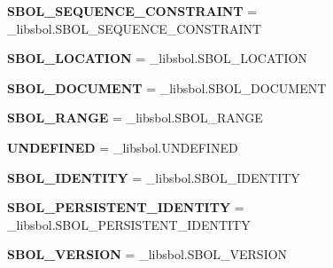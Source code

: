 \begin{DoxyCompactItemize}
\item 
{\bfseries S\+B\+O\+L\+\_\+\+S\+E\+Q\+U\+E\+N\+C\+E\+\_\+\+C\+O\+N\+S\+T\+R\+A\+I\+NT} = \+\_\+libsbol.\+S\+B\+O\+L\+\_\+\+S\+E\+Q\+U\+E\+N\+C\+E\+\_\+\+C\+O\+N\+S\+T\+R\+A\+I\+NT\hypertarget{namespacesbol_1_1libsbol_a6328208da40ad7d5da19bcf525c2790e}{}\label{namespacesbol_1_1libsbol_a6328208da40ad7d5da19bcf525c2790e}

\item 
{\bfseries S\+B\+O\+L\+\_\+\+L\+O\+C\+A\+T\+I\+ON} = \+\_\+libsbol.\+S\+B\+O\+L\+\_\+\+L\+O\+C\+A\+T\+I\+ON\hypertarget{namespacesbol_1_1libsbol_a0762a29718f5005067f16c55235fb21b}{}\label{namespacesbol_1_1libsbol_a0762a29718f5005067f16c55235fb21b}

\item 
{\bfseries S\+B\+O\+L\+\_\+\+D\+O\+C\+U\+M\+E\+NT} = \+\_\+libsbol.\+S\+B\+O\+L\+\_\+\+D\+O\+C\+U\+M\+E\+NT\hypertarget{namespacesbol_1_1libsbol_af6a785921d877371417eea332d1b019b}{}\label{namespacesbol_1_1libsbol_af6a785921d877371417eea332d1b019b}

\item 
{\bfseries S\+B\+O\+L\+\_\+\+R\+A\+N\+GE} = \+\_\+libsbol.\+S\+B\+O\+L\+\_\+\+R\+A\+N\+GE\hypertarget{namespacesbol_1_1libsbol_a3f0e6f012174781aa70df693dac69582}{}\label{namespacesbol_1_1libsbol_a3f0e6f012174781aa70df693dac69582}

\item 
{\bfseries U\+N\+D\+E\+F\+I\+N\+ED} = \+\_\+libsbol.\+U\+N\+D\+E\+F\+I\+N\+ED\hypertarget{namespacesbol_1_1libsbol_a505eb25f5d753ab1459db06990931b10}{}\label{namespacesbol_1_1libsbol_a505eb25f5d753ab1459db06990931b10}

\item 
{\bfseries S\+B\+O\+L\+\_\+\+I\+D\+E\+N\+T\+I\+TY} = \+\_\+libsbol.\+S\+B\+O\+L\+\_\+\+I\+D\+E\+N\+T\+I\+TY\hypertarget{namespacesbol_1_1libsbol_ab443dfbfe5a89280aceed1b301eb6c3e}{}\label{namespacesbol_1_1libsbol_ab443dfbfe5a89280aceed1b301eb6c3e}

\item 
{\bfseries S\+B\+O\+L\+\_\+\+P\+E\+R\+S\+I\+S\+T\+E\+N\+T\+\_\+\+I\+D\+E\+N\+T\+I\+TY} = \+\_\+libsbol.\+S\+B\+O\+L\+\_\+\+P\+E\+R\+S\+I\+S\+T\+E\+N\+T\+\_\+\+I\+D\+E\+N\+T\+I\+TY\hypertarget{namespacesbol_1_1libsbol_afd94ac44b715bba5d5e9594384760cb4}{}\label{namespacesbol_1_1libsbol_afd94ac44b715bba5d5e9594384760cb4}

\item 
{\bfseries S\+B\+O\+L\+\_\+\+V\+E\+R\+S\+I\+ON} = \+\_\+libsbol.\+S\+B\+O\+L\+\_\+\+V\+E\+R\+S\+I\+ON\hypertarget{namespacesbol_1_1libsbol_a2feb5116dba0b29704c3dcb6a4f834ca}{}\label{namespacesbol_1_1libsbol_a2feb5116dba0b29704c3dcb6a4f834ca}


\end{DoxyCompactItemize}
